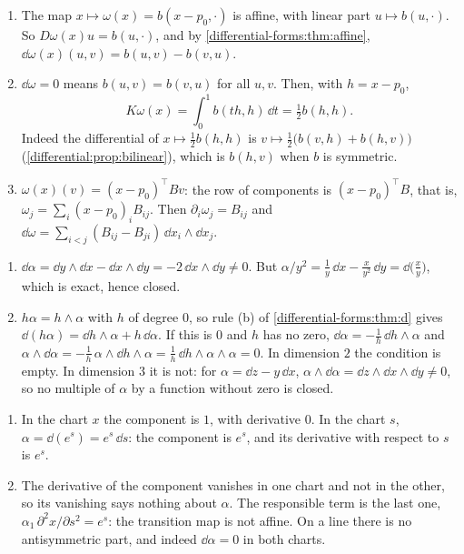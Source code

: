 \begin{enumerate}[nosep]
  \item The map $x\mapsto\omega(x) = b(x - p_0, \cdot)$ is affine, with
        linear part $u\mapsto b(u, \cdot)$. So
        $D\omega(x)u = b(u, \cdot)$, and by
        \cref{differential-forms:thm:affine},
        $\dd\omega(x)(u, v) = b(u, v) - b(v, u)$.
  \item $\dd\omega = 0$ means $b(u, v) = b(v, u)$ for all $u, v$. Then,
        with $h = x - p_0$,
        \[
          K\omega(x) = \int_0^1b(th, h)\,\dd t = \tfrac12b(h, h) .
        \]
        Indeed the differential of $x\mapsto\frac12b(h, h)$ is
        $v\mapsto\frac12\bigl(b(v, h) + b(h, v)\bigr)$
        (\cref{differential:prop:bilinear}), which is $b(h, v)$ when
        $b$ is symmetric.
  \item $\omega(x)(v) = (x - p_0)^\top Bv$: the row of components is
        $(x - p_0)^\top B$, that is,
        $\omega_j = \sum_i(x - p_0)_iB_{ij}$. Then
        $\partial_i\omega_j = B_{ij}$ and
        $\dd\omega = \sum_{i<j}(B_{ij} - B_{ji})\,\dd x_i\wedge\dd x_j$.
\end{enumerate}

\begin{enumerate}[nosep]
  \item $\dd\alpha = \dd y\wedge\dd x - \dd x\wedge\dd y
        = -2\,\dd x\wedge\dd y\neq0$. But
        $\alpha/y^2 = \frac1y\,\dd x - \frac x{y^2}\,\dd y
        = \dd\bigl(\frac xy\bigr)$, which is exact, hence closed.
  \item $h\alpha = h\wedge\alpha$ with $h$ of degree $0$, so rule (b)
        of \cref{differential-forms:thm:d} gives
        $\dd(h\alpha) = \dd h\wedge\alpha + h\,\dd\alpha$. If this is
        $0$ and $h$ has no zero,
        $\dd\alpha = -\frac1h\,\dd h\wedge\alpha$ and
        $\alpha\wedge\dd\alpha = -\frac1h\,\alpha\wedge\dd h\wedge\alpha
        = \frac1h\,\dd h\wedge\alpha\wedge\alpha = 0$. In dimension $2$
        the condition is empty. In dimension $3$ it is not: for
        $\alpha = \dd z - y\,\dd x$,
        $\alpha\wedge\dd\alpha = \dd z\wedge\dd x\wedge\dd y\neq0$, so
        no multiple of $\alpha$ by a function without zero is closed.
\end{enumerate}

\begin{enumerate}[nosep]
  \item In the chart $x$ the component is $1$, with derivative $0$. In
        the chart $s$, $\alpha = \dd(e^s) = e^s\,\dd s$: the component
        is $e^s$, and its derivative with respect to $s$ is $e^s$.
  \item The derivative of the component vanishes in one chart and not
        in the other, so its vanishing says nothing about $\alpha$.
        The responsible term is the last one,
        $\alpha_1\,\partial^2x/\partial s^2 = e^s$: the transition map
        is not affine. On a line there is no antisymmetric part, and
        indeed $\dd\alpha = 0$ in both charts.
\end{enumerate}

